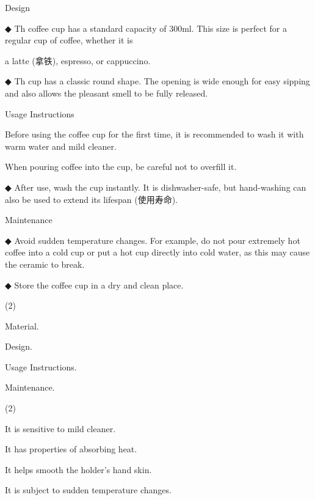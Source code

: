 \documentclass{英语试卷}
\begin{document}
\par [图片]\par
\par Design\par
\par ◆ Th coffee cup has a standard capacity of 300ml. This size is perfect for a regular cup of coffee, whether it is\par
\par a latte (拿铁), espresso, or cappuccino.\par
\par ◆ Th cup has a classic round shape. The opening is wide enough for easy sipping and also allows the pleasant smell to be fully released.\par
\par Usage Instructions\par
\par Before using the coffee cup for the first time, it is recommended to wash it with warm water and mild cleaner.\par
\par When pouring coffee into the cup, be careful not to overfill it.\par
\par ◆ After use, wash the cup instantly. It is dishwasher-safe, but hand-washing can also be used to extend its lifespan (使用寿命).\par
\par Maintenance\par
\par ◆ Avoid sudden temperature changes. For example, do not pour extremely hot coffee into a cold cup or put a hot cup directly into cold water, as this may cause the ceramic to break.\par
\par ◆ Store the coffee cup in a dry and clean place.\par
{}
\begin{choices}(2)
  \item Material.
  \item Design.
  \item Usage Instructions.
  \item Maintenance.
\end{choices}
\begin{choices}(2)
  \item It is sensitive to mild cleaner.
  \item It has properties of absorbing heat.
  \item It helps smooth the holder's hand skin.
  \item It is subject to sudden temperature changes.
\end{choices}
\end{document}
